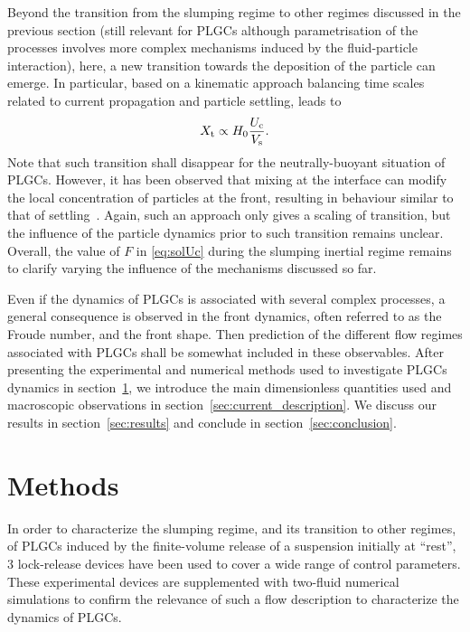 \documentclass[12pt]{article}
\begin{document}
Beyond the transition from the slumping regime to other regimes discussed in the previous section (still relevant for PLGCs although parametrisation of the processes involves more complex mechanisms induced by the fluid-particle interaction), here, a new transition towards the deposition of the particle can emerge. In particular, based on a kinematic approach balancing time scales related to current propagation and particle settling, leads to
%
\begin{equation}
	\label{eq:Xt_settling}
	X_{\text t} \propto H_0\frac{U_{\text{c}}}{V_{\text s}}.
\end{equation}
%
Note that such transition shall disappear for the neutrally-buoyant situation of PLGCs.
However, it has been observed that mixing at the interface can modify the local concentration of particles at the front, resulting in behaviour similar to that of settling~\cite{Schneider2023}. Again, such an approach only gives a scaling of transition, but the influence of the particle dynamics prior to such transition remains unclear. Overall, the value of $F$ in \eqref{eq:solUc} during the slumping inertial regime remains to clarify varying the influence of the mechanisms discussed so far.

Even if the dynamics of PLGCs is associated with several complex processes, a general consequence is observed in the front dynamics, often referred to as the Froude number, and the front shape. Then prediction of the different flow regimes associated with PLGCs shall be somewhat included in these observables. After presenting the experimental and numerical methods used to investigate PLGCs dynamics in section~\ref{sec:methods}, we introduce the main dimensionless quantities used and macroscopic observations in section~\ref{sec:current_description}. We discuss our results in section~\ref{sec:results} and conclude in section~\ref{sec:conclusion}.

\section{Methods}
\label{sec:methods}

In order to characterize the slumping regime, and its transition to other regimes, of PLGCs induced by the finite-volume release of a suspension initially at ``rest'', 3 lock-release devices have been used to cover a wide range of control parameters. These experimental devices are supplemented with two-fluid numerical simulations to confirm the relevance of such a flow description to characterize the dynamics of PLGCs.
\end{document}
